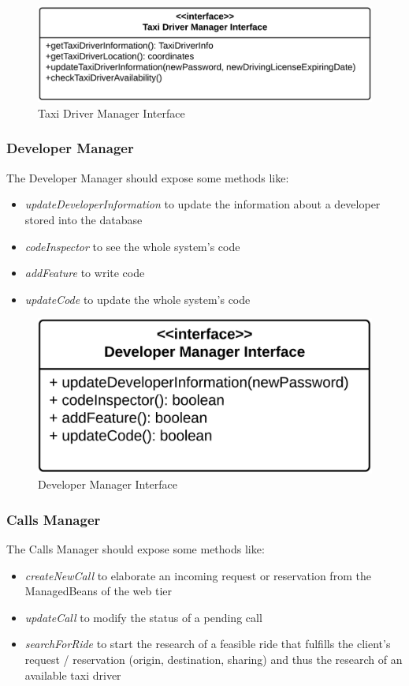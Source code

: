 \begin{figure}[htbp]
\centering
\includegraphics[width=\textwidth]{cpt/img/ComponentInterfacesTaxiDriverManagerInterface}
\caption{Taxi Driver Manager Interface}
\end{figure}
\clearpage

\subsubsection{Developer Manager}
The Developer Manager should expose some methods like:
\begin{itemize}
	\item \textit{updateDeveloperInformation} to update the information about a developer stored into the database
	\item \textit{codeInspector} to see the whole system's code
	\item \textit{addFeature} to write code
	\item \textit{updateCode} to update the whole system's code
\end{itemize}

\begin{figure}[htbp]
\centering
\includegraphics[width=\textwidth]{cpt/img/ComponentInterfacesDeveloperManagerInterface}
\caption{Developer Manager Interface}
\end{figure}
\clearpage

\subsubsection{Calls Manager}
The Calls Manager should expose some methods like:
\begin{itemize}
	\item \textit{createNewCall} to elaborate an incoming request or reservation from the ManagedBeans of the web tier
	\item \textit{updateCall} to modify the status of a pending call
	\item \textit{searchForRide} to start the research of a feasible ride that fulfills the client's request / reservation (origin, destination, sharing) and thus the research of an available taxi driver
\end{itemize}


